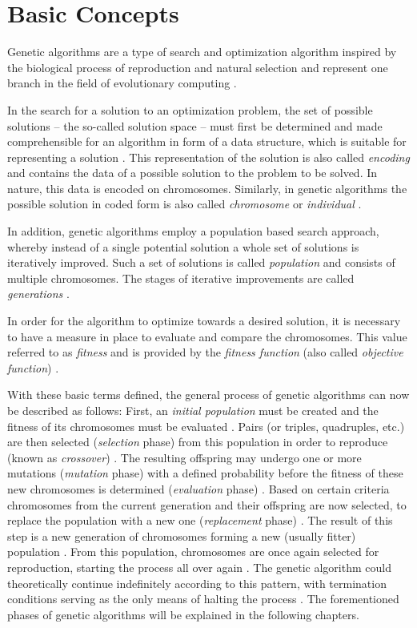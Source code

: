 \documentclass[sigconf]{acmart}
\begin{document}
\section{Basic Concepts}
Genetic algorithms are a type of search and optimization algorithm inspired
by the biological process of reproduction and natural selection and represent
one branch in the field of evolutionary computing \cite{goldberg1989, Carr2014}.

In the search for a solution to an optimization problem, the set of possible
solutions -- the so-called solution space -- must first be determined and made
comprehensible for an algorithm in form of a data structure, which is suitable
for representing a solution \cite{Affenzeller2009}.
This representation of the solution is also called \textit{encoding} and
contains the data of a possible solution to the problem to be solved.
In nature, this data is encoded on chromosomes. Similarly, in genetic algorithms
the possible solution in coded form is also called \textit{chromosome} or
\textit{individual} \cite{Affenzeller2009}.

In addition, genetic algorithms employ a population based search approach,
whereby instead of a single potential solution a whole set of solutions is
iteratively improved. Such a set of solutions is called \textit{population}
and consists of multiple chromosomes. The stages of iterative improvements
are called \textit{generations} \cite{Affenzeller2009}.

In order for the algorithm to optimize towards a desired solution, it is
necessary to have a measure in place to evaluate and compare the chromosomes.
This value referred to as \textit{fitness} and is provided by the
\textit{fitness function} (also called \textit{objective function})
\cite{Affenzeller2009}.

With these basic terms defined, the general process of genetic algorithms
can now be described as follows:
First, an \textit{initial population} must be created and the fitness of its
chromosomes must be evaluated \cite{Affenzeller2009}.
Pairs (or triples, quadruples, etc.) are then selected
(\textit{selection} phase) from this population in order to reproduce
(known as \textit{crossover}) \cite{Affenzeller2009}.
The resulting offspring may undergo one or more mutations
(\textit{mutation} phase) with a defined probability before the fitness of
these new chromosomes is determined (\textit{evaluation} phase)
\cite{Affenzeller2009}.
Based on certain criteria chromosomes from the current generation and their
offspring are now selected, to replace the population with a new one
(\textit{replacement} phase) \cite{Affenzeller2009}.
The result of this step is a new generation of chromosomes forming a new
(usually fitter) population \cite{Affenzeller2009}.
From this population, chromosomes are once again selected for reproduction,
starting the process all over again \cite{Affenzeller2009}.
The genetic algorithm could theoretically continue indefinitely according to
this pattern, with termination conditions serving as the only means of halting
the process \cite{Beligiannis2009}.
%
The forementioned phases of genetic algorithms will be explained in the
following chapters.
\end{document}
